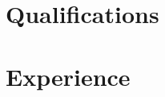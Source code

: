 

    \makecvtitle
    \section{Qualifications}
        
        
        
    \section{Experience}
        
        
        

